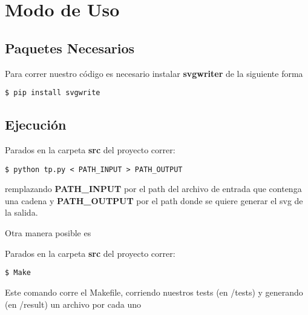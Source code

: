 \section{Modo de Uso}
\subsection{Paquetes Necesarios}
\begin{framed}
Para correr nuestro c\'odigo es necesario instalar \textbf{svgwriter} de la siguiente forma
\begin{verbatim}
$ pip install svgwrite
\end{verbatim}
\end{framed}
\subsection{Ejecuci\'on}
\begin{framed}
Parados en la carpeta \textbf{src} del proyecto correr: 
\begin{verbatim}
$ python tp.py < PATH_INPUT > PATH_OUTPUT
\end{verbatim}
\end{framed}
remplazando \textbf{PATH\_INPUT} por el path del archivo de entrada que contenga una cadena y \textbf{PATH\_OUTPUT} por el path donde se quiere generar el svg de la salida.

Otra manera posible es

\begin{framed}
Parados en la carpeta \textbf{src} del proyecto correr: 
\begin{verbatim}
$ Make
\end{verbatim}
\end{framed}

Este comando corre el Makefile, corriendo nuestros tests (en /tests) y generando (en /result) un archivo por cada uno

